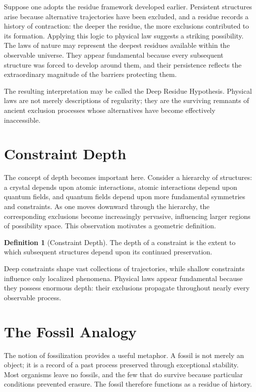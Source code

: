 \documentclass[11pt,oneside]{book}
\theoremstyle{plain}
\theoremstyle{definition}
\newtheorem{definition}[theorem]{Definition}
\theoremstyle{remark}
\begin{document}
Suppose one adopts the residue framework developed earlier. Persistent structures arise because alternative trajectories have been excluded, and a residue records a history of contraction: the deeper the residue, the more exclusions contributed to its formation. Applying this logic to physical law suggests a striking possibility. The laws of nature may represent the deepest residues available within the observable universe. They appear fundamental because every subsequent structure was forced to develop around them, and their persistence reflects the extraordinary magnitude of the barriers protecting them.

The resulting interpretation may be called the Deep Residue Hypothesis. Physical laws are not merely descriptions of regularity; they are the surviving remnants of ancient exclusion processes whose alternatives have become effectively inaccessible.

\section{Constraint Depth}

The concept of depth becomes important here. Consider a hierarchy of structures: a crystal depends upon atomic interactions, atomic interactions depend upon quantum fields, and quantum fields depend upon more fundamental symmetries and constraints. As one moves downward through the hierarchy, the corresponding exclusions become increasingly pervasive, influencing larger regions of possibility space. This observation motivates a geometric definition.

\begin{definition}[Constraint Depth]
The depth of a constraint is the extent to which subsequent structures depend upon its continued preservation.
\end{definition}

Deep constraints shape vast collections of trajectories, while shallow constraints influence only localized phenomena. Physical laws appear fundamental because they possess enormous depth: their exclusions propagate throughout nearly every observable process.

\section{The Fossil Analogy}

The notion of fossilization provides a useful metaphor. A fossil is not merely an object; it is a record of a past process preserved through exceptional stability. Most organisms leave no fossils, and the few that do survive because particular conditions prevented erasure. The fossil therefore functions as a residue of history.
\end{document}
